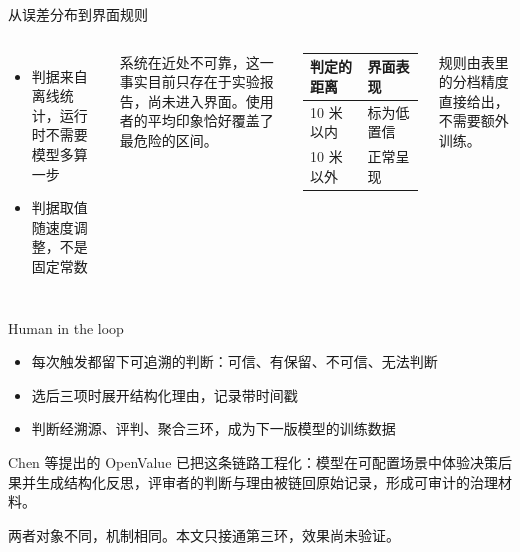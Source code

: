 \documentclass[serif, aspectratio=169]{beamer}
\newcommand{\currentref}{}
\newcommand{\src}[1]{\gdef\currentref{#1}}
\begin{document}
\begin{frame}{从误差分布到界面规则}

\begin{columns}[T]
\begin{itemize}
    \item 判据来自离线统计，运行时不需要模型多算一步
    \item 判据取值随速度调整，不是固定常数
\end{itemize}

\vspace{0.2cm}
{\small 系统在近处不可靠，这一事实目前只存在于实验报告，尚未进入界面。使用者的平均印象恰好覆盖了最危险的区间。}

\centering
\footnotesize
\begin{tabular}{@{}ll@{}}
\toprule
判定的距离 & 界面表现 \\
\midrule
10 米以内 & 标为低置信 \\
10 米以外 & 正常呈现 \\
\bottomrule
\end{tabular}

\vspace{0.25cm}
{\scriptsize 规则由表里的分档精度直接给出，不需要额外训练。}
\end{columns}

\src{Parasuraman R, Riley V. Humans and Automation: Use, Misuse, Disuse, Abuse. Human Factors, 1997.}
\end{frame}

\begin{frame}{Human in the loop}

\begin{itemize}
    \item 每次触发都留下可追溯的判断：可信、有保留、不可信、无法判断
    \item 选后三项时展开结构化理由，记录带时间戳
    \item 判断经溯源、评判、聚合三环，成为下一版模型的训练数据
\end{itemize}

\vspace{0.2cm}
Chen 等提出的 OpenValue 已把这条链路工程化：模型在可配置场景中体验决策后果并生成结构化反思，评审者的判断与理由被链回原始记录，形成可审计的治理材料。

\vspace{0.15cm}
{\small 两者对象不同，机制相同。本文只接通第三环，效果尚未验证。}

\src{Chen L, Tong M, Zhang Z, et al. OpenValue: A Participatory Governance Infrastructure for AI Value Formation. Preprint, 2026.}
\end{frame}
\end{document}
